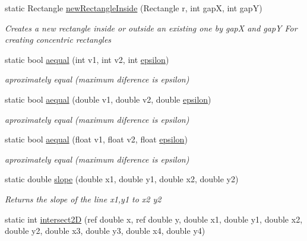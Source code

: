 \begin{DoxyCompactItemize}
static Rectangle \mbox{\hyperlink{class_r_c___framework_1_1_util_ad343f81943f78c8a9ac412a0d6c217e5}{new\+Rectangle\+Inside}} (Rectangle r, int gapX, int gapY)
\begin{DoxyCompactList}\small\item\em Creates a new rectangle inside or outside an existing one by gapX and gapY For creating concentric rectangles \end{DoxyCompactList}\item 
static bool \mbox{\hyperlink{class_r_c___framework_1_1_util_a283ca8d3dea62fbca3b399c2193a1741}{aequal}} (int v1, int v2, int \mbox{\hyperlink{class_r_c___framework_1_1_util_a0e915c7b69e861aa3da7617fce83851f}{epsilon}})
\begin{DoxyCompactList}\small\item\em aproximately equal (maximum diference is epsilon) \end{DoxyCompactList}\item 
static bool \mbox{\hyperlink{class_r_c___framework_1_1_util_ab3e2109463c60b9576f6ece00d48ecf1}{aequal}} (double v1, double v2, double \mbox{\hyperlink{class_r_c___framework_1_1_util_a0e915c7b69e861aa3da7617fce83851f}{epsilon}})
\begin{DoxyCompactList}\small\item\em aproximately equal (maximum diference is epsilon) \end{DoxyCompactList}\item 
static bool \mbox{\hyperlink{class_r_c___framework_1_1_util_a3311ca5f6822df17f8c910a3ad5e4296}{aequal}} (float v1, float v2, float \mbox{\hyperlink{class_r_c___framework_1_1_util_a0e915c7b69e861aa3da7617fce83851f}{epsilon}})
\begin{DoxyCompactList}\small\item\em aproximately equal (maximum diference is epsilon) \end{DoxyCompactList}\item 
static double \mbox{\hyperlink{class_r_c___framework_1_1_util_a739e0ec7a821d4f5c30e41bf45c553a2}{slope}} (double x1, double y1, double x2, double y2)
\begin{DoxyCompactList}\small\item\em Returns the slope of the line x1,y1 to x2 y2 \end{DoxyCompactList}\item 
static int \mbox{\hyperlink{class_r_c___framework_1_1_util_a56a2d48ad29e3cd4fb4e92a0f4cd42cd}{intersect2D}} (ref double x, ref double y, double x1, double y1, double x2, double y2, double x3, double y3, double x4, double y4)

\end{DoxyCompactItemize}
